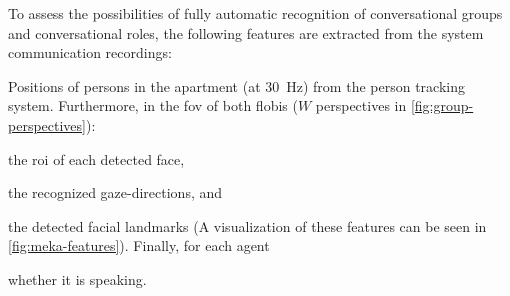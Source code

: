 To assess the possibilities of fully automatic recognition of \glspl{conversational group} and \glspl{conversational role}, the following features are extracted from the system communication recordings:
\begin{enumerate*}[label=(\arabic*)]
   \item Positions of persons in the \gls{apartment} (at \SI{30}{\Hz}) from the person tracking system. Furthermore, in the \gls{fov} of both \glspl{flobi} (\(W\) perspectives in \cref{fig:group-perspectives}): 
   \item the \gls{roi} of each detected face,
   \item the recognized gaze-directions, and
   \item the detected facial landmarks (A visualization of these features can be seen in \vref{fig:meka-features}). Finally, for each agent
   \item whether it is speaking.
\end{enumerate*}

